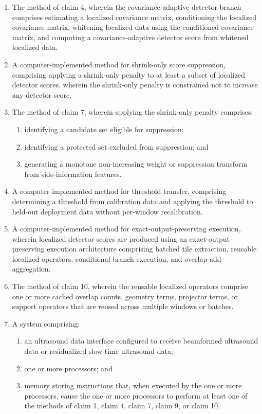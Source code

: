 \documentclass[11pt]{article}
\begin{document}
\begin{enumerate}
\item The method of claim 4, wherein the covariance-adaptive detector branch comprises estimating a localized covariance matrix, conditioning the localized covariance matrix, whitening localized data using the conditioned covariance matrix, and computing a covariance-adaptive detector score from whitened localized data.

\item A computer-implemented method for shrink-only score suppression, comprising applying a shrink-only penalty to at least a subset of localized detector scores, wherein the shrink-only penalty is constrained not to increase any detector score.

\item The method of claim 7, wherein applying the shrink-only penalty comprises:
\begin{enumerate}[label=\alph*)]
\item identifying a candidate set eligible for suppression;
\item identifying a protected set excluded from suppression; and
\item generating a monotone non-increasing weight or suppression transform from side-information features.
\end{enumerate}

\item A computer-implemented method for threshold transfer, comprising determining a threshold from calibration data and applying the threshold to held-out deployment data without per-window recalibration.

\item A computer-implemented method for exact-output-preserving execution, wherein localized detector scores are produced using an exact-output-preserving execution architecture comprising batched tile extraction, reusable localized operators, conditional branch execution, and overlap-add aggregation.

\item The method of claim 10, wherein the reusable localized operators comprise one or more cached overlap counts, geometry terms, projector terms, or support operators that are reused across multiple windows or batches.

\item A system comprising:
\begin{enumerate}[label=\alph*)]
\item an ultrasound data interface configured to receive beamformed ultrasound data or residualized slow-time ultrasound data;
\item one or more processors; and
\item memory storing instructions that, when executed by the one or more processors, cause the one or more processors to perform at least one of the methods of claim 1, claim 4, claim 7, claim 9, or claim 10.
\end{enumerate}


\end{enumerate}
\end{document}
